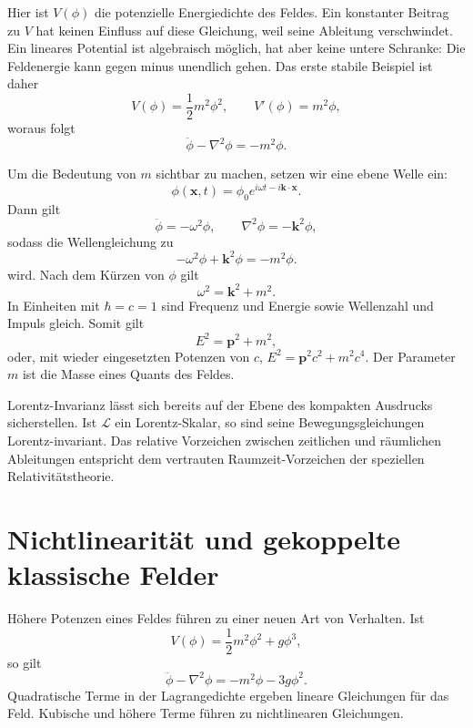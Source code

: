 Hier ist \(V(\phi)\) die potenzielle Energiedichte des Feldes. Ein konstanter Beitrag zu \(V\) hat keinen Einfluss auf diese Gleichung, weil seine Ableitung verschwindet. Ein lineares Potential ist algebraisch möglich, hat aber keine untere Schranke: Die Feldenergie kann gegen minus unendlich gehen. Das erste stabile Beispiel ist daher
\begin{equation}
V(\phi)=\frac12m^2\phi^2,
\qquad
V'(\phi)=m^2\phi,
\end{equation}
woraus folgt
\begin{equation}
\ddot\phi-\nabla^2\phi=-m^2\phi.
\end{equation}

Um die Bedeutung von \(m\) sichtbar zu machen, setzen wir eine ebene Welle ein:
\begin{equation}
\phi(\mathbf x,t)=\phi_0e^{i\omega t-i\mathbf k\cdot\mathbf x}.
\end{equation}
Dann gilt
\begin{equation}
\ddot\phi=-\omega^2\phi,
\qquad
\nabla^2\phi=-\mathbf k^2\phi,
\end{equation}
sodass die Wellengleichung zu
\begin{equation}
-\omega^2\phi+\mathbf k^2\phi=-m^2\phi.
\end{equation}
wird. Nach dem Kürzen von \(\phi\) gilt
\begin{equation}
\omega^2=\mathbf k^2+m^2.
\end{equation}
In Einheiten mit \(\hbar=c=1\) sind Frequenz und Energie sowie Wellenzahl und Impuls gleich. Somit gilt
\begin{equation}
E^2=\mathbf p^2+m^2,
\end{equation}
oder, mit wieder eingesetzten Potenzen von \(c\), \(E^2=\mathbf p^2c^2+m^2c^4\). Der Parameter \(m\) ist die Masse eines Quants des Feldes.

Lorentz-Invarianz lässt sich bereits auf der Ebene des kompakten Ausdrucks sicherstellen. Ist \(\mathcal L\) ein Lorentz-Skalar, so sind seine Bewegungsgleichungen Lorentz-invariant. Das relative Vorzeichen zwischen zeitlichen und räumlichen Ableitungen entspricht dem vertrauten Raumzeit-Vorzeichen der speziellen Relativitätstheorie.

\section{Nichtlinearität und gekoppelte klassische Felder}

Höhere Potenzen eines Feldes führen zu einer neuen Art von Verhalten. Ist
\begin{equation}
V(\phi)=\frac12m^2\phi^2+g\phi^3,
\end{equation}
so gilt
\begin{equation}
\ddot\phi-\nabla^2\phi=-m^2\phi-3g\phi^2.
\end{equation}
Quadratische Terme in der Lagrangedichte ergeben lineare Gleichungen für das Feld. Kubische und höhere Terme führen zu nichtlinearen Gleichungen.

